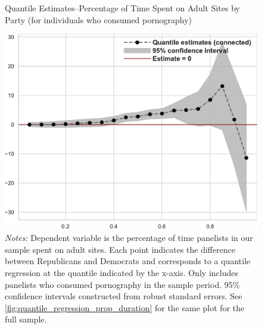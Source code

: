 \documentclass[12pt, letterpaper]{article}
\begin{document}
\begin{figure}[ht]
	\centering
	\caption{Quantile Estimates--Percentage of Time Spent on Adult Sites by Party (for individuals who consumed pornography)}
	\includegraphics[width=.55\linewidth]{../figs/quantile_reg_nonzero_proportion_duration_adult.pdf}
	\caption*{\footnotesize \emph{Notes:} 
		Dependent variable is the percentage of time panelists in our sample spent on adult sites.
		Each point indicates the difference between Republicans and Democrats and corresponds to a quantile regression at the quantile indicated by the x-axis.
		Only includes panelists who consumed pornography in the sample period.
		95\% confidence intervals constructed from robust standard errors.
		See \cref{fig:quantile_regression_prop_duration} for the same plot for the full sample.
	}
	\label{fig:quantile_regression_prop_duration_nonzeroes}
\end{figure}
\end{document}
